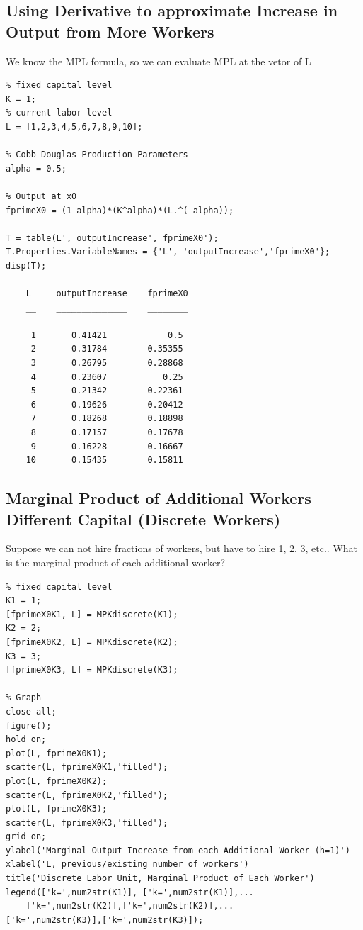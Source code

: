 \documentclass[
]{book}
\begin{document}
\hypertarget{using-derivative-to-approximate-increase-in-output-from-more-workers}{%
\subsection{Using Derivative to approximate Increase in Output from More Workers}\label{using-derivative-to-approximate-increase-in-output-from-more-workers}}

We know the MPL formula, so we can evaluate MPL at the vetor of L

\begin{verbatim}
% fixed capital level
K = 1;
% current labor level
L = [1,2,3,4,5,6,7,8,9,10];

% Cobb Douglas Production Parameters
alpha = 0.5;

% Output at x0
fprimeX0 = (1-alpha)*(K^alpha)*(L.^(-alpha));

T = table(L', outputIncrease', fprimeX0');
T.Properties.VariableNames = {'L', 'outputIncrease','fprimeX0'};
disp(T);

    L     outputIncrease    fprimeX0
    __    ______________    ________

     1       0.41421            0.5 
     2       0.31784        0.35355 
     3       0.26795        0.28868 
     4       0.23607           0.25 
     5       0.21342        0.22361 
     6       0.19626        0.20412 
     7       0.18268        0.18898 
     8       0.17157        0.17678 
     9       0.16228        0.16667 
    10       0.15435        0.15811 
\end{verbatim}

\hypertarget{marginal-product-of-additional-workers-different-capital-discrete-workers}{%
\subsection{Marginal Product of Additional Workers Different Capital (Discrete Workers)}\label{marginal-product-of-additional-workers-different-capital-discrete-workers}}

Suppose we can not hire fractions of workers, but have to hire 1, 2, 3,
etc.. What is the marginal product of each additional worker?

\begin{verbatim}
% fixed capital level
K1 = 1;
[fprimeX0K1, L] = MPKdiscrete(K1);
K2 = 2;
[fprimeX0K2, L] = MPKdiscrete(K2);
K3 = 3;
[fprimeX0K3, L] = MPKdiscrete(K3);

% Graph
close all;
figure();
hold on;
plot(L, fprimeX0K1);
scatter(L, fprimeX0K1,'filled');
plot(L, fprimeX0K2);
scatter(L, fprimeX0K2,'filled');
plot(L, fprimeX0K3);
scatter(L, fprimeX0K3,'filled');
grid on;
ylabel('Marginal Output Increase from each Additional Worker (h=1)')
xlabel('L, previous/existing number of workers')
title('Discrete Labor Unit, Marginal Product of Each Worker')
legend(['k=',num2str(K1)], ['k=',num2str(K1)],...
    ['k=',num2str(K2)],['k=',num2str(K2)],...
['k=',num2str(K3)],['k=',num2str(K3)]);
\end{verbatim}
\end{document}

